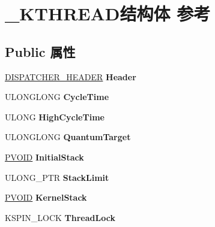 \hypertarget{struct___k_t_h_r_e_a_d}{}\section{\+\_\+\+K\+T\+H\+R\+E\+A\+D结构体 参考}
\label{struct___k_t_h_r_e_a_d}
\subsection*{Public 属性}
\begin{DoxyCompactItemize}
\item 
\mbox{\label{struct___k_t_h_r_e_a_d_ad77684fef690b1bc6c5d0834e489cbb8}} 
\hyperlink{struct___d_i_s_p_a_t_c_h_e_r___h_e_a_d_e_r}{D\+I\+S\+P\+A\+T\+C\+H\+E\+R\+\_\+\+H\+E\+A\+D\+ER} {\bfseries Header}
\item 
\mbox{\label{struct___k_t_h_r_e_a_d_a0bd81f79370352f3f1bd701c389760dc}} 
U\+L\+O\+N\+G\+L\+O\+NG {\bfseries Cycle\+Time}
\item 
\mbox{\label{struct___k_t_h_r_e_a_d_a427f15e3a0039b9cb38059347b69252a}} 
U\+L\+O\+NG {\bfseries High\+Cycle\+Time}
\item 
\mbox{\label{struct___k_t_h_r_e_a_d_a7b6f6dadf08aa654ad04ac8cae22d4b4}} 
U\+L\+O\+N\+G\+L\+O\+NG {\bfseries Quantum\+Target}
\item 
\mbox{\label{struct___k_t_h_r_e_a_d_a0771d4da77271221fd386c16a0a793c2}} 
\hyperlink{interfacevoid}{P\+V\+O\+ID} {\bfseries Initial\+Stack}
\item 
\mbox{\label{struct___k_t_h_r_e_a_d_aae90607d18b2d3067dd4cd6ef0be593a}} 
U\+L\+O\+N\+G\+\_\+\+P\+TR {\bfseries Stack\+Limit}
\item 
\mbox{\label{struct___k_t_h_r_e_a_d_a92214d959c081973f7c3a73da0e91d0c}} 
\hyperlink{interfacevoid}{P\+V\+O\+ID} {\bfseries Kernel\+Stack}
\item 
\mbox{\label{struct___k_t_h_r_e_a_d_a6416bcc0fc52201fda2a68723bb25ea9}} 
K\+S\+P\+I\+N\+\_\+\+L\+O\+CK {\bfseries Thread\+Lock}

\end{DoxyCompactItemize}
